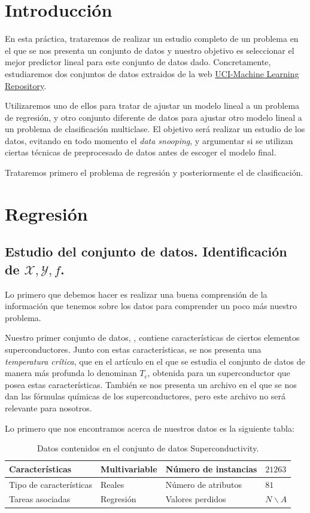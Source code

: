 \documentclass[a4paper, 20pt]{article}
\begin{document}
\section*{Introducción}

En esta práctica, trataremos de realizar un estudio completo de un problema en el que se nos
presenta un conjunto de datos y nuestro objetivo es seleccionar el mejor predictor lineal para
este conjunto de datos dado. Concretamente, estudiaremos dos conjuntos de datos extraidos
de la web \href{https://archive.ics.uci.edu/ml/index.php}{UCI-Machine Learning Repository}.

Utilizaremos uno de ellos para tratar de ajustar un modelo lineal a un problema de regresión, y otro conjunto diferente de datos para ajustar otro modelo lineal a un problema de clasificación multiclase. El objetivo será realizar un estudio de los datos, evitando en todo momento el \emph{data snooping}, y argumentar si se utilizan ciertas técnicas de preprocesado de datos antes de escoger el modelo final.

Trataremos primero el problema de regresión y posteriormente el de clasificación.

\section{Regresión}

\subsection{Estudio del conjunto de datos. Identificación de $\mathcal X,\mathcal Y,f$.}

Lo primero que debemos hacer es realizar una buena comprensión de la información que tenemos sobre los datos para comprender un poco más nuestro problema.

Nuestro primer conjunto de datos, \cite{superdata}, contiene características de ciertos elementos superconductores. Junto con estas características, se nos presenta una \emph{temperatura crítica}, que en el artículo en el que se estudia el conjunto de datos de manera más profunda \cite{hamidieh} lo denominan $T_c$, obtenida para un superconductor que posea estas características. También se nos presenta un archivo en el que se nos dan las fórmulas químicas de los superconductores, pero este archivo no será relevante para nosotros.

Lo primero que nos encontramos acerca de nuestros datos es la siguiente tabla:
\begin{table}[h]
  \centering
  \begin{tabular}{|l|l|l|l|}
    \hline
    Características         & Multivariable & Número de instancias & $21263$ \\ \hline
    Tipo de características & Reales        & Número de atributos  & $81$    \\ \hline
    Tareas asociadas        & Regresión     & Valores perdidos     & $N\backslash A$   \\ \hline
  \end{tabular}
  \caption{Datos contenidos en el conjunto de datos Superconductivity.}
\end{table}
\end{document}
